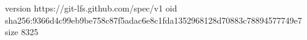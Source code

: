 version https://git-lfs.github.com/spec/v1
oid sha256:9366d4c99eb9be758c87f5adac6e8c1fda1352968128d70883c78894577749e7
size 8325
